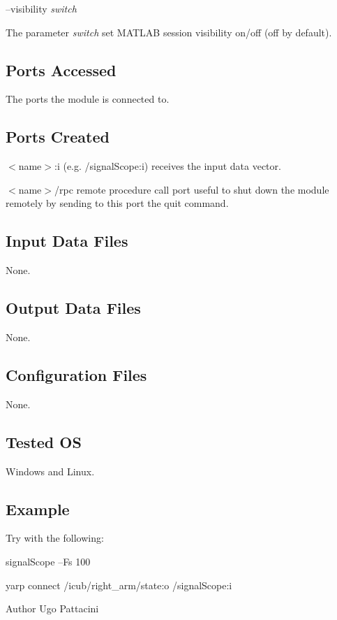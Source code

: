 --visibility {\itshape switch} 
\begin{DoxyItemize}
\item The parameter {\itshape switch} set M\+A\+T\+L\+AB session visibility on/off (off by default).
\end{DoxyItemize}\hypertarget{group__icub__signalScope_portsa_sec}{}\subsection{Ports Accessed}\label{group__icub__signalScope_portsa_sec}
The ports the module is connected to.\hypertarget{group__icub__signalScope_portsc_sec}{}\subsection{Ports Created}\label{group__icub__signalScope_portsc_sec}

\begin{DoxyItemize}
\item {\itshape } $<$name$>$\+:i (e.\+g. /signal\+Scope\+:i) receives the input data vector.
\item {\itshape } $<$name$>$/rpc remote procedure call port useful to shut down the module remotely by sending to this port the \textquotesingle{}quit\textquotesingle{} command.
\end{DoxyItemize}\hypertarget{group__icub__signalScope_in_files_sec}{}\subsection{Input Data Files}\label{group__icub__signalScope_in_files_sec}
None.\hypertarget{group__icub__signalScope_out_data_sec}{}\subsection{Output Data Files}\label{group__icub__signalScope_out_data_sec}
None.\hypertarget{group__icub__signalScope_conf_file_sec}{}\subsection{Configuration Files}\label{group__icub__signalScope_conf_file_sec}
None.\hypertarget{group__icub__signalScope_tested_os_sec}{}\subsection{Tested OS}\label{group__icub__signalScope_tested_os_sec}
Windows and Linux.\hypertarget{group__icub__signalScope_example_sec}{}\subsection{Example}\label{group__icub__signalScope_example_sec}
Try with the following\+:


\begin{DoxyItemize}
\item signal\+Scope --Fs 100
\item yarp connect /icub/right\+\_\+arm/state\+:o /signal\+Scope\+:i 
\end{DoxyItemize}

\begin{DoxyAuthor}{Author}
Ugo Pattacini 
\end{DoxyAuthor}
